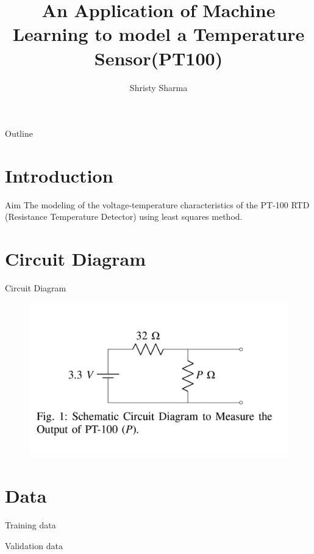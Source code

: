 \documentclass{beamer}
\title[PT-100 ]{An Application of Machine Learning to model a Temperature Sensor(PT100)}
\author{Shristy Sharma}
\theoremstyle{remark}
\begin{document}
\begin{frame}
    \titlepage 
\end{frame}

\logo{}

\begin{frame}{Outline}
    \tableofcontents
\end{frame}


\section{Introduction}
\begin{frame}{Aim}
The modeling of the voltage-temperature characteristics of the PT-100 RTD (Resistance Temperature Detector) using least squares method.

\end{frame}
\section{Circuit Diagram}
 \begin{frame}{Circuit Diagram}
 
 \begin{figure}[!ht]
        \centering
        \includegraphics[width=0.6\columnwidth]{figs/ckt.png}
    \end{figure}
\end{frame}

\section{Data}
 \begin{frame}{Training data}
\begin{table}[!ht]
    \centering
    
    \caption{Training data}
    \label{tab:Training data }
\end{table}
\end{frame}
 \begin{frame}{Validation data}
\begin{table}[!ht]
    \centering
    
    \caption{Validation data}
    \label{tab:Validation data}
\end{table}
\end{frame}
\end{document}
